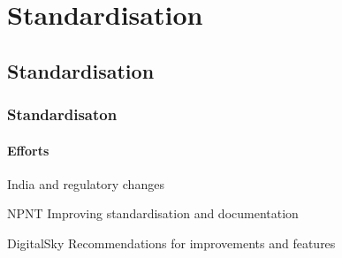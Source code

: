 \documentclass[usenames,dvipsnames,aspectratio=169,serif]{beamer}
\begin{document}

\section{Standardisation}
\subsection{Standardisation}
\begin{frame}[fragile] %
   \frametitle{Standardisaton}
   \framesubtitle{Efforts}
   India and regulatory changes
   \begin{block}{NPNT}
      Improving standardisation and documentation
   \end{block}

   \begin{block}{DigitalSky\texttrademark}
      Recommendations for improvements and features
   \end{block}

\end{frame}

\end{document}
